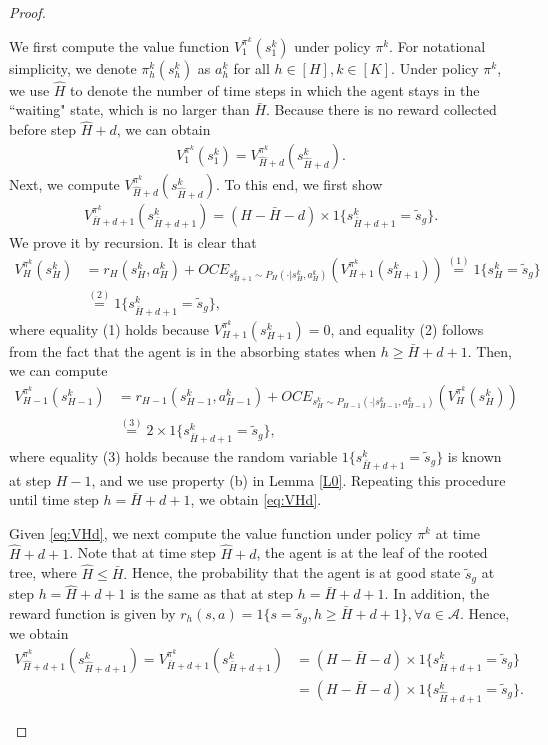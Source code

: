 \documentclass[11pt]{article}
\newcommand{\1}{\mathbbm{1}}
\begin{document}
\begin{proof}
\begin{itemize}
We first compute the value function $V_1^{\pi^k}(s_1^k)$ under policy $\pi^k$. For notational simplicity, we denote $\pi_h^k(s_h^k)$ as $a_h^k$ for all $h\in [H],k\in [K]$. Under policy $\pi^k$, we use $\hat{H}$ to denote the 
number of time steps in which the agent stays in the ``waiting" state, which is no larger than $\bar{H}$. Because there is no reward collected before step $\hat{H}+d$, we can obtain
\begin{align}\label{eq:V1pik}
V_1^{\pi^k}(s_1^k)=V_{\hat{H}+d}^{\pi^k}(s_{\hat{H}+d}^k).
\end{align}
Next, we compute $V_{\hat{H}+d}^{\pi^k}(s_{\hat{H}+d}^k).$ To this end, we first show 
\begin{align}\label{eq:VHd}
V_{\bar{H}+d+1}^{\pi^k}(s_{\bar{H}+d+1}^k)=(H-\bar{H}-d)\times 1\{s^k_{\bar{H}+d+1}=\tilde{s}_g\}.
\end{align}
We prove it by recursion. It is clear that 
\begin{align*}
V_{H}^{\pi^k}(s_{H}^k)&=r_H(s_{H}^k,a_{H}^k)+OCE_{s_{H+1}^k\sim P_H(\cdot\vert s_{H}^k,a_{H}^k)}(V_{H+1}^{\pi^k}(s_{H+1}^k))\overset{(1)}{=}1\{s_H^k=\tilde{s}_g\}\\
&\overset{(2)}{=}1\{s^k_{\bar{H}+d+1}=\tilde{s}_g\},
\end{align*}
where equality (1) holds because $V_{H+1}^{\pi^k}(s_{H+1}^k)=0$, and equality (2) follows from the fact that the agent is in the absorbing states when $h\geq \bar{H}+d+1$. Then, we can compute 
\begin{align*}
V_{H-1}^{\pi^k}(s_{H-1}^k)&=r_{H-1}(s_{H-1}^k,a_{H-1}^k)+OCE_{s^k_{H}\sim P_{H-1}(\cdot\vert s_{H-1}^k,a_{H-1}^k)}(V_{H}^{\pi^k}(s_{H}^k))\\
&\overset{(3)}{=}2\times 1\{s^k_{\bar{H}+d+1}=\tilde{s}_g\},
\end{align*}
where equality (3) holds because the random variable $1\{s^k_{\bar{H}+d+1}=\tilde{s}_g\}$ is known at step $H-1$, and we use property (b) in Lemma \ref{L0}. Repeating this procedure until time step $h=\bar{H}+d+1$, we obtain \eqref{eq:VHd}.  

Given \eqref{eq:VHd}, we next compute the value function under policy $\pi^k$ at time $\hat{H}+d+1$. Note that at time step $\hat{H}+d$, the agent is at the leaf of the rooted tree, where $\hat{H} \le \bar H.$ Hence, the probability that the agent is at good state $\tilde{s}_g$ at step $h=\hat{H}+d+1$ is the same as that at step $h=\bar{H}+d+1$. In addition, the reward function is given by $r_h(s,a)=1\{s=\tilde{s}_g,h\geq \bar{H}+d+1\},\forall a\in\mathcal{A}$. Hence, we obtain 
\begin{align*}
V_{\hat{H}+d+1}^{\pi^k}(s_{\hat{H}+d+1}^k)=V_{\bar{H}+d+1}^{\pi^k}(s_{\bar{H}+d+1}^k) 
&=(H-\bar{H}-d)\times 1\{s^k_{\bar{H}+d+1} 
=\tilde{s}_g\} \\
&=(H-\bar{H}-d)\times 1\{s^k_{\hat{H}+d+1}=\tilde{s}_g\}.
\end{align*}



\end{itemize}
\end{proof}
\end{document}
